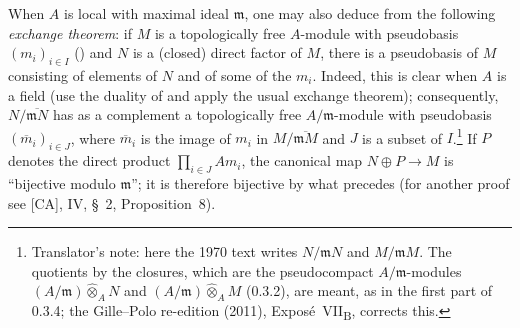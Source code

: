When \(A\) is local with maximal ideal \(\mathfrak m\), one may also
deduce from  the following \emph{exchange theorem}:
if \(M\) is a topologically free \(A\)-module with pseudobasis
\((m_i)_{i\in I}\) \textup{()} and \(N\) is a (closed)
direct factor of \(M\), there is a pseudobasis of \(M\) consisting of
elements of \(N\) and of some of the \(m_i\). Indeed, this is clear when
\(A\) is a field (use the duality of  and apply the
usual exchange theorem); consequently, \(N/\overline{\mathfrak mN}\) has
as a complement a topologically free \(A/\mathfrak m\)-module with
pseudobasis \((\overline{m}_i)_{i\in J}\), where \(\overline{m}_i\) is
the image of \(m_i\) in \(M/\overline{\mathfrak mM}\) and \(J\) is a
subset of \(I\).\footnote{Translator's note: here the 1970 text writes \(N/\mathfrak mN\) and
\(M/\mathfrak mM\). The quotients by the closures, which are the pseudocompact \(A/\mathfrak m\)-modules
\((A/\mathfrak m)\widehat\otimes_AN\) and \((A/\mathfrak m)\widehat\otimes_AM\) (0.3.2), are meant, as in the
first part of 0.3.4; the Gille--Polo re-edition (2011), Expos\'e~VII\textsubscript{B}, corrects this.} If
\(P\) denotes the direct product
\(\prod_{i\in J}Am_i\), the canonical map \(N\oplus P\to M\) is
``bijective modulo \(\mathfrak m\)''; it is therefore bijective by what
precedes (for another proof see \textup{[CA]}, IV, \S~2,
Proposition~8).

